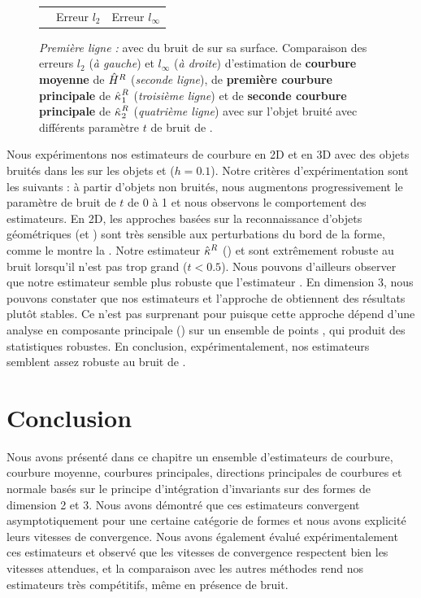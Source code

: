 \begin{figure}[ht]
\begin{center}
\begin{tabular}{@{}l c c @{}}
      &
      Erreur $l_2$ &
      Erreur $l_\infty$
    \end{tabular}
    \caption{
      \emph{Première ligne :} \RoundedCube avec du bruit de \Kanungo sur sa
      surface.
       Comparaison des erreurs $l_2$ (\emph{à gauche}) et $l_\infty$ (\emph{à
       droite}) d'estimation de \textbf{courbure moyenne} de $\hat{H}^{R}$
       (\emph{seconde ligne}), de \textbf{première courbure principale} de
       $\hat{\kappa_{}}_{1}^{R}$ (\emph{troisième ligne}) et de \textbf{seconde
       courbure principale} de $\hat{\kappa_{}}_{2}^{R}$ (\emph{quatrième ligne}) avec
       \JetFitting sur l'objet \RoundedCube bruité avec différents paramètre $t$
       de bruit de \Kanungo.
      }
      \label{fig:curv-experiments-rounded-noise}
  \end{center}
\end{figure}
%
Nous expérimentons nos estimateurs de courbure en 2D et en 3D avec des objets bruités
dans les
sur les objets \Ellipse et \RoundedCube ($h = 0.1$). Notre critères
d'expérimentation sont les suivants : à partir d'objets non bruités, nous
augmentons progressivement le paramètre de bruit de \Kanungo $t$ de 0 à 1 et
nous observons le comportement des estimateurs. En 2D, les approches basées sur
la reconnaissance d'objets géométriques (\MDSS et \MDCA) sont très sensible aux
perturbations du bord de la forme, comme le montre la
. Notre estimateur $\hat{\kappa}^{R}$
(\II) et \BC sont extrêmement robuste au bruit lorsqu'il n'est pas trop grand
($t < 0.5$). Nous pouvons d'ailleurs observer que notre estimateur semble plus
robuste que l'estimateur \BC. En dimension 3, nous pouvons constater que nos
estimateurs et l'approche de \JetFitting obtiennent des résultats plutôt
stables. Ce n'est pas surprenant pour \JetFitting puisque cette approche dépend
d'une analyse en composante principale (\ACP) sur un ensemble de points , qui
produit des statistiques robustes. En conclusion, expérimentalement, nos
estimateurs semblent assez robuste au bruit de \Kanungo.

%
\section{Conclusion}
\label{sec:estimators:conclusion}
%
Nous avons présenté dans ce chapitre un ensemble d'estimateurs de courbure,
courbure moyenne, courbures principales, directions principales de courbures et
normale basés sur le principe d'intégration d'invariants sur des formes de
dimension 2 et 3. Nous avons démontré que ces estimateurs convergent
asymptotiquement pour une certaine catégorie de formes et nous avons explicité
leurs vitesses de convergence. Nous avons également évalué expérimentalement ces
estimateurs et observé que les vitesses de convergence respectent bien les
vitesses attendues, et la comparaison avec les autres méthodes rend nos
estimateurs très compétitifs, même en présence de bruit.


